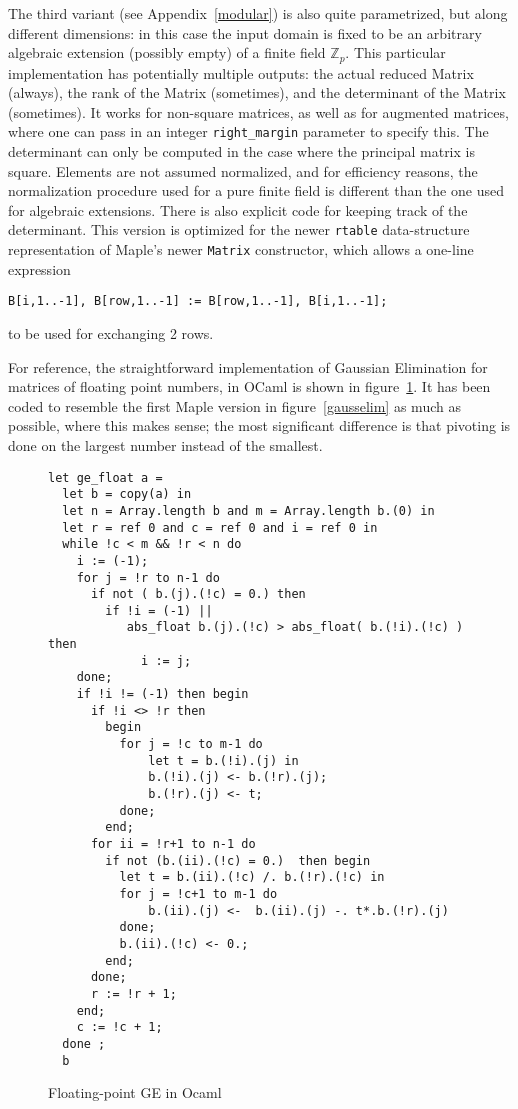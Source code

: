 \documentclass[11pt]{elsart}
\begin{document}
The third variant (see Appendix~\ref{modular}) is also quite parametrized,
but along different dimensions: in this case the input domain is fixed
to be an arbitrary algebraic extension (possibly empty) of a finite
field $\mathbb{Z}_p$.  This particular implementation has potentially
multiple outputs: the actual reduced Matrix (always), the rank of the
Matrix (sometimes), and the determinant of the Matrix (sometimes).  It
works for non-square matrices, as well as for augmented matrices, where
one can pass in an integer \texttt{right\_margin} parameter to specify this.
The determinant can only be computed in the case where the principal 
matrix is square.  Elements are not assumed normalized, and for 
efficiency reasons, the normalization procedure used for a pure finite
field is different than the one used for algebraic extensions.  There
is also explicit code for keeping track of the determinant.  This 
version is optimized for the newer \texttt{rtable} data-structure representation
of Maple's newer \texttt{Matrix} constructor, which allows a one-line
expression
\begin{verbatim}
B[i,1..-1], B[row,1..-1] := B[row,1..-1], B[i,1..-1];
\end{verbatim}
to be used for exchanging 2 rows.  

For reference, the straightforward implementation of Gaussian Elimination
for matrices of floating point numbers, in OCaml is shown in
figure~\ref{ocaml1}.  It has been coded to resemble the first
Maple version in figure~\ref{gausselim} as much as possible, where 
this makes sense; the most significant difference is that pivoting is
done on the largest number instead of the smallest.

\begin{figure}
    \begin{small}
\begin{verbatim}
let ge_float a =
  let b = copy(a) in
  let n = Array.length b and m = Array.length b.(0) in
  let r = ref 0 and c = ref 0 and i = ref 0 in
  while !c < m && !r < n do
    i := (-1);
    for j = !r to n-1 do
      if not ( b.(j).(!c) = 0.) then 
        if !i = (-1) || 
           abs_float b.(j).(!c) > abs_float( b.(!i).(!c) ) then
             i := j;
    done;
    if !i != (-1) then begin
      if !i <> !r then
        begin
          for j = !c to m-1 do
              let t = b.(!i).(j) in
              b.(!i).(j) <- b.(!r).(j);
              b.(!r).(j) <- t;
          done;
        end;
      for ii = !r+1 to n-1 do
        if not (b.(ii).(!c) = 0.)  then begin
          let t = b.(ii).(!c) /. b.(!r).(!c) in
          for j = !c+1 to m-1 do
              b.(ii).(j) <-  b.(ii).(j) -. t*.b.(!r).(j)
          done;
          b.(ii).(!c) <- 0.;
        end;
      done;
      r := !r + 1;
    end;
    c := !c + 1;
  done ;
  b
  \end{verbatim} 
  \end{small}
  \caption{Floating-point GE in Ocaml}\label{ocaml1}
\end{figure}
\end{document}
